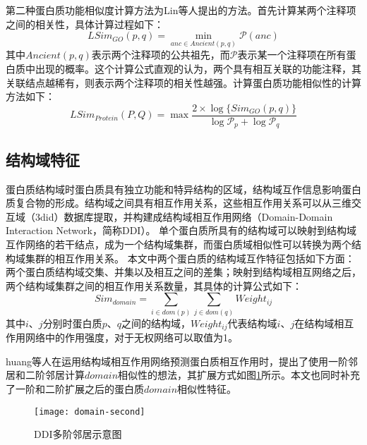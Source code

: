 第二种蛋白质功能相似度计算方法为Lin等人\cite{lin_information-theoretic_1998}提出的方法。首先计算某两个注释项之间的相关性，具体计算过程如下：
\begin{equation}
    \label{equ:feat:go:SimItemLin}
    LSim_{GO}(p,q)=\min_{anc \in Ancient(p,q)}\mathcal{P} (anc)
\end{equation}
其中$Ancient(p,q)$表示两个注释项的公共祖先，而$\mathcal{P}$表示某一个注释项在所有蛋白质中出现的概率。这个计算公式直观的认为，两个具有相互关联的功能注释，其关联结点越稀有，则表示两个注释项的相关性越强。计算蛋白质功能相似性的计算方法如下：
\begin{equation}
    \label{equ:feat:go:SimProteinLin}
    LSim_{Protein}(P,Q)=\max{\frac{2\times \log \{Sim_{GO}(p,q)\}}{\log {\mathcal{P}_p}+\log {\mathcal{P}_q}} }
\end{equation}


\subsection{结构域特征}
\label{subsection:domainSimilarity}
蛋白质结构域时蛋白质具有独立功能和特异结构的区域，结构域互作信息影响蛋白质复合物的形成\cite{kim_relating_2006}。结构域之间具有相互作用关系，这些相互作用关系可以从三维交互域（3did）数据库\cite{mosca_3did_2014}提取，并构建成结构域相互作用网络（Domain-Domain Interaction Network，简称DDI）。
单个蛋白质所具有的结构域可以映射到结构域互作网络的若干结点，成为一个结构域集群，而蛋白质域相似性可以转换为两个结构域集群的相互作用关系。
本文中两个蛋白质的结构域互作特征包括如下方面：两个蛋白质结构域交集、并集以及相互之间的差集；映射到结构域相互网络之后，两个结构域集群之间的相互作用关系数量，其具体的计算公式如下：
\begin{equation}
    \label{equ:feat:domain}
    Sim_{domain} = \sum_{i \in dom(p)}{\sum_{j \in dom(q)}{Weight_{ij}}}
\end{equation}
其中$i$、$j$分别时蛋白质$p$、$q$之间的结构域，$Weight_{ij}$代表结构域$i$、$j$在结构域相互作用网络中的作用强度，对于无权网络可以取值为1。

huang等人\cite{huang_protein-protein_2013}在运用结构域相互作用网络预测蛋白质相互作用时，提出了使用一阶邻居和二阶邻居计算$domain$相似性的想法，其扩展方式如图\ref{fig:domain-second}所示。本文也同时补充了一阶和二阶扩展之后的蛋白质$domain$相似性特征。
\begin{figure}[htbp]
    \centering
    \texttt{[image: domain-second]}
    \caption{DDI多阶邻居示意图}
    \label{fig:domain-second}
\end{figure}


